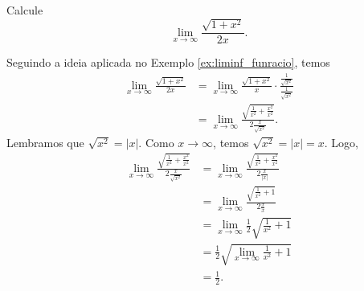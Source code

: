 \begin{exeresol}
  Calcule
  \begin{equation}
    \lim_{x\to\infty} \frac{\sqrt{1+x^2}}{2x}.
  \end{equation}
\end{exeresol}
\begin{resol}
  Seguindo a ideia aplicada no Exemplo \ref{ex:liminf_funracio}, temos
  \begin{align}
    \lim_{x\to\infty} \frac{\sqrt{1+x^2}}{2x} &= \lim_{x\to\infty} \frac{\sqrt{1+x^2}}{x}\cdot \frac{\frac{1}{\sqrt{x^2}}}{\frac{1}{\sqrt{x^2}}} \\
                                             &= \lim_{x\to\infty} \frac{\sqrt{\frac{1}{x^2}+\frac{x^2}{x^2}}}{2\frac{x}{\sqrt{x^2}}}.
  \end{align}
  Lembramos que $\sqrt{x^2}=|x|$. Como $x\to\infty$, temos $\sqrt{x^2} = |x|=x$. Logo,
  \begin{align}
    \lim_{x\to\infty} \frac{\sqrt{\frac{1}{x^2}+\frac{x^2}{x^2}}}{2\frac{x}{\sqrt{x^2}}} &= \lim_{x\to\infty} \frac{\sqrt{\frac{1}{x^2}+\frac{x^2}{x^2}}}{2\frac{x}{|x|}}\\
                                                                                         &= \lim_{x\to\infty} \frac{\sqrt{\frac{1}{x^2}+1}}{2\frac{x}{x}}\\
                                                                                         &= \lim_{x\to\infty} \frac{1}{2}\sqrt{\frac{1}{x^2}+1}\\
                                                                                         &= \frac{1}{2}\sqrt{\lim_{x\to\infty} \frac{1}{x^2}+1}\\
                                                                                         &= \frac{1}{2}.
  \end{align}
\end{resol}

